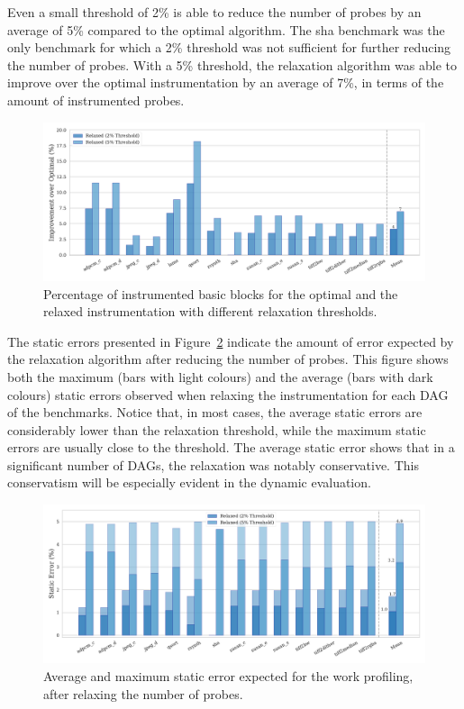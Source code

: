 Even a small threshold of 2\% is able to reduce the number of probes by an average of 5\% compared to the optimal algorithm.
The {\flagstype sha} benchmark was the only benchmark for which a 2\% threshold was not sufficient for further reducing the number of probes.
With a 5\% threshold, the relaxation algorithm was able to improve over the optimal instrumentation by an average of 7\%, in terms of the amount of instrumented probes.

\begin{figure}[ht]
    \centering
    \includegraphics[width=\textwidth]{figs/num-probes-improvement.pdf}
    \caption{Percentage of instrumented basic blocks for the optimal and the relaxed instrumentation with different relaxation thresholds.}
    \label{fig:num-probes-improvement}
\end{figure}

The static errors presented in Figure~\ref{fig:static-instr-error} indicate the amount of error expected by the relaxation algorithm after reducing the number of probes.
This figure shows both the maximum (bars with light colours) and the average (bars with dark colours) static errors observed when relaxing the instrumentation for each DAG of the benchmarks.
Notice that, in most cases, the average static errors are considerably lower than the relaxation threshold, while the maximum static errors are usually close to the threshold.
The average static error shows that in a significant number of DAGs, the relaxation was notably conservative.
This conservatism will be especially evident in the dynamic evaluation.

\begin{figure}[ht]
    \centering
    \includegraphics[width=\textwidth]{figs/instr-error.pdf}
    \caption{Average and maximum static error expected for the work profiling, after relaxing the number of probes.}
    \label{fig:static-instr-error}
\end{figure}


